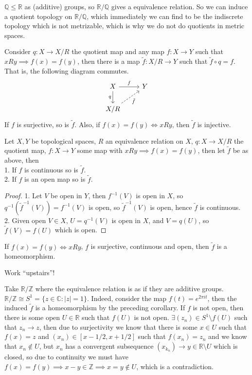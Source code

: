 \begin{example}
    $\mathbb Q\le\mathbb R$ as (additive) groups, so $\mathbb R/\mathbb Q$ gives a equivalence relation.
    So we can induce a quotient topology on $\mathbb R/\mathbb Q$, which immediately we can find to be the indiscrete topology which is not metrizable, which is why we do not do quotients in metric spaces.
\end{example}
Consider $q:X\to X/R$ the quotient map and any map $f:X\to Y$ such that $xRy\implies f(x)=f(y)$, then there is a map $\tilde{f}:X/R\to Y$ such that $\tilde{f}\circ q=f$.
That is, the following diagram commutes.
$$
\begin{tikzcd}
    X\arrow{r}{f}\arrow[swap]{d}{q}&Y\\
    X/R\arrow[swap,dashed]{ur}{\tilde{f}}&
\end{tikzcd}
$$
If $f$ is surjective, so is $\tilde{f}$.
Also, if $f(x)=f(y)\iff xRy$, then $\tilde{f}$ is injective.
\begin{proposition}
    Let $X,Y$ be topological spaces, $R$ an equivalence relation on $X$, $q:X\to X/R$ the quotient map, $f:X\to Y$ some map with $xRy\implies f(x)=f(y)$, then let $\tilde{f}$ be as above, then\\
    1. If $f$ is continuous so is $\tilde{f}$.\\
    2. If $f$ is an open map so is $\tilde{f}$.
\end{proposition}
\begin{proof}
    1. Let $V$ be open in $Y$, then $f^{-1}(V)$ is open in $X$, so $q^{-1}(\tilde{f}^{-1}(V))=f^{-1}(V)$ is open, so $\tilde{f}^{-1}(V)$ is open, hence $\tilde{f}$ is continuous.\\
    2. Given open $V\in X$, $U=q^{-1}(V)$ is open in $X$, and $V=q(U)$, so $\tilde{f}(V)=f(U)$ which is open.
\end{proof}
\begin{corollary}
    If $f(x)=f(y)\iff xRy$, $f$ is surjective, continuous and open, then $\tilde{f}$ is a homeomorphism.
\end{corollary}
\begin{remark}
    Work ``upstairs''!
\end{remark}
\begin{example}
    Take $\mathbb R/\mathbb Z$ where the equivalence relation is as if they are additive groups.
    $\mathbb R/\mathbb Z\cong S^1=\{z\in\mathbb C:|z|=1\}$.
    Indeed, consider the map $f(t)=e^{2\pi it}$, then the induced $\tilde{f}$ is a homeomorphism by the preceding corollary.
    If $f$ is not open, then there is some open $U\in\mathbb R$ such that $f(U)$ is not open.
    $\exists (z_n)\in S^1\setminus f(U)$ such that $z_n\to z$, then due to surjectivity we know that there is some $x\in U$ such that $f(x)=z$ and $(x_n)\in [x-1/2,x+1/2]$ such that $f(x_n)=z_n$ and we know that $x_n\notin U$, but $x_n$ has a convergent subsequence $(x_{k_n})\to y\in \mathbb R\setminus U$ which is closed, so due to continuity we must have $f(x)=f(y)\implies x-y\in\mathbb Z\implies x=y\notin U$, which is a contradiction.
\end{example}